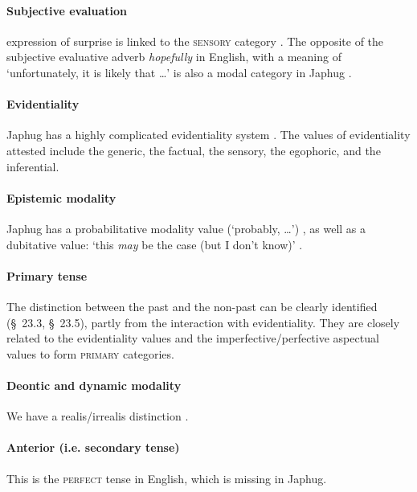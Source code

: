 \documentclass[a4paper, oneside, 12pt]{report}
\newcommand*{\citesec}[1]{\S~{#1}}
\newcommand*{\citetable}[1]{Table~{#1}}
\newcommand{\form}[1]{\emph{#1}}
\newcommand{\category}[1]{\textsc{#1}}
\newcommand{\translate}[1]{`#1'}
\begin{document}
\paragraph*{Subjective evaluation}
expression of surprise is linked to the \category{sensory} category 
\citep[\citesec{21.3.2.4}]{jacques2021grammar}.
The opposite of the subjective evaluative adverb \form{hopefully} in English,
with a meaning of \translate{unfortunately, it is likely that \dots}
is also a modal category in Japhug \citep[\citesec{21.7.1}]{jacques2021grammar}.

\paragraph*{Evidentiality}
Japhug has a highly complicated evidentiality system 
\citep[\citetable{31.4}]{jacques2015sketch}.
The values of evidentiality attested include 
the generic, the factual, the sensory, the egophoric, and the inferential.

\paragraph*{Epistemic modality}
Japhug has a probabilitative modality value 
(\translate{probably, \dots})
\citep[\citesec{21.7.2}]{jacques2021grammar},
as well as a dubitative value:
\translate{this \emph{may} be the case (but I don't know)}
\citep[\citesec{21.4.4}]{jacques2021grammar}.

\paragraph*{Primary tense}
The distinction between the past and the non-past
can be clearly identified (\citesec{23.3}, \citesec{23.5}),
partly from the interaction with evidentiality.
They are closely related to the evidentiality values
and the imperfective/perfective aspectual values
to form \category{primary} categories.

\paragraph*{Deontic and dynamic modality}
We have a realis/irrealis distinction \citep[\citesec{21.4.1}]{jacques2021grammar}.

\paragraph*{Anterior (i.e. secondary tense)}
This is the \category{perfect} tense in English,
which is missing in Japhug.
\end{document}
